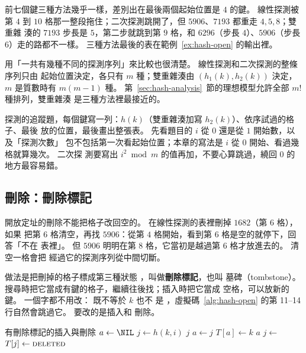 前七個鍵三種方法幾乎一樣，差別出在最後兩個起始位置是 $4$ 的鍵。 線性探測被第 $4$
到 $10$ 格那一整段拖住；二次探測跳開了，但 $5906$、$7193$ 都重走 $4, 5, 8$；雙重雜
湊的 $7193$ 步長是 $5$，第二步就跳到第 $9$ 格，和 $6296$（步長 $4$）、$5906$（步長
$6$）走的路都不一樣。 三種方法最後的表在範例~\ref{ex:hash-open} 的輸出裡。


用「一共有幾種不同的探測序列」來比較也很清楚。 線性探測和二次探測的整條序列只由
起始位置決定，各只有 $m$ 種；雙重雜湊由 $(h_1(k), h_2(k))$ 決定，$m$ 是質數時有
$m(m-1)$ 種。 第~\ref{sec:hash-analysis}~節的理想模型允許全部 $m!$ 種排列，雙重雜湊
是三種方法裡最接近的。

\begin{examnote}
探測的追蹤題，每個鍵寫一列：$h(k)$（雙重雜湊加寫 $h_2(k)$）、依序試過的格子、最後
放的位置，最後畫出整張表。 先看題目的 $i$ 從 $0$ 還是從 $1$ 開始數，以及「探測次數」
包不包括第一次看起始位置；本章的寫法是 $i$ 從 $0$ 開始、看過幾格就算幾次。 二次探
測要寫出 $i^2 \bmod m$ 的值再加，不要心算跳過，繞回 $0$ 的地方最容易錯。
\end{examnote}

\subsection{刪除：刪除標記}
\label{sec:hash-tomb}

開放定址的刪除不能把格子改回空的。 在線性探測的表裡刪掉 $1682$（第 $6$ 格），如果
把第 $6$ 格清空，再找 $5906$：從第 $4$ 格開始，看到第 $6$ 格是空的就停下，回答「不在
表裡」。 但 $5906$ 明明在第 $8$ 格，它當初是越過第 $6$ 格才放進去的。 清空一格會把
經過它的探測序列從中間切斷。

做法是把刪掉的格子標成第三種狀態 \hashDEL，叫做\textbf{刪除標記}，也叫
墓碑（tombstone）。 搜尋時把它當成有鍵的格子，繼續往後找；插入時把它當成
空格，可以放新的鍵。  一個字都不用改：\hashDEL{} 既不等於 $k$ 也不
是 \NIL，虛擬碼~\ref{alg:hash-open} 的第 11--14 行自然會跳過它。 要改的是插入和
刪除。

\begin{pseudo}[label=alg:hash-tomb]{有刪除標記的插入與刪除}
    \State $a \gets \NIL$ 
        \State $j \gets h(k, i)$
            \State \Return $j$ 
        \EndIf
            \State $a \gets j$
        \EndIf
            \State \Break
        \EndIf
    \EndFor
        \State {}
    \EndIf
    \State $T[a] \gets k$
    \State \Return $a$
\EndFunction
{}
    \State $j \gets$ 
        \State $T[j] \gets \textsc{deleted}$
    \EndIf
\EndProcedure
\end{pseudo}

